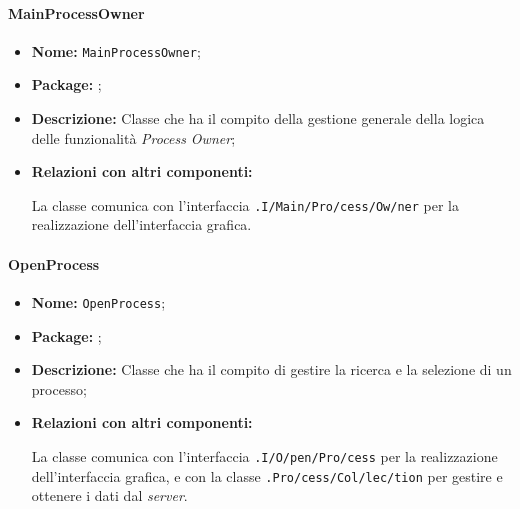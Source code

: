 \paragraph{MainProcessOwner}
\begin{flushleft}
\begin{itemize}
\item \textbf{Nome:} \texttt{MainProcessOwner};
\item \textbf{Package:} \texttt{\logicAdmin{}};
\item \textbf{Descrizione:} Classe che ha il compito della gestione generale della logica delle funzionalità \textit{Process Owner};
\item \textbf{Relazioni con altri componenti:}
\begin{sloppypar}
La classe comunica con l'interfaccia \texttt{\viewAdmin{}.I\fshyp{}Main\fshyp{}Pro\fshyp{}cess\fshyp{}Ow\fshyp{}ner} per la realizzazione dell'interfaccia grafica.
\end{sloppypar}
\end{itemize}
\end{flushleft}

\paragraph{OpenProcess}
\begin{flushleft}
\begin{itemize}
\item \textbf{Nome:} \texttt{OpenProcess};
\item \textbf{Package:} \texttt{\logicAdmin{}};
\item \textbf{Descrizione:} Classe che ha il compito di gestire la ricerca e la selezione di un processo;
\item \textbf{Relazioni con altri componenti:}
\begin{sloppypar}
La classe comunica con l'interfaccia \texttt{\viewAdmin{}.I\fshyp{}O\fshyp{}pen\fshyp{}Pro\fshyp{}cess} per la realizzazione dell'interfaccia grafica, e con la classe \texttt{\collectionp{}.Pro\fshyp{}cess\fshyp{}Col\fshyp{}lec\fshyp{}tion} per gestire e ottenere i dati dal \textit{server}.
\end{sloppypar}
\end{itemize}
\end{flushleft}

